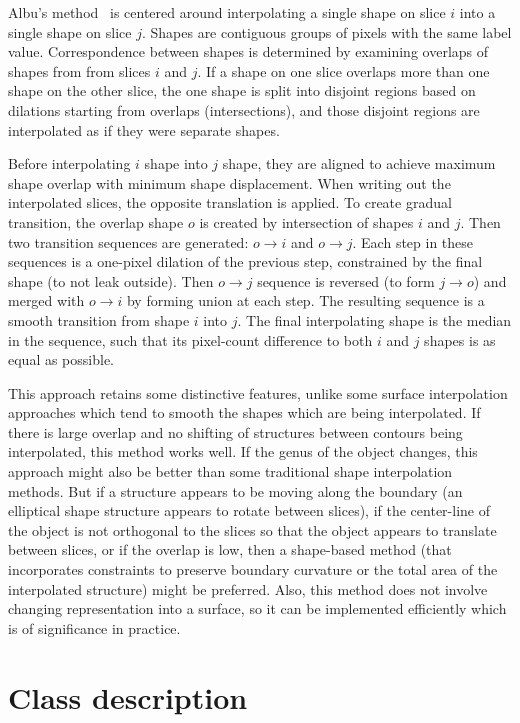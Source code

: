 \documentclass{InsightArticle}
\begin{document}
Albu's method~\cite{Albu2008} is centered around interpolating a single shape on
slice $i$ into a single shape on slice $j$.
Shapes are contiguous groups of pixels with the same label value.
Correspondence between shapes is determined by examining overlaps
of shapes from from slices $i$ and $j$.
If a shape on one slice overlaps more than one shape on the other slice,
the one shape is split into disjoint regions based on dilations
starting from overlaps (intersections),
and those disjoint regions are interpolated as if they were separate shapes.

Before interpolating $i$ shape into $j$ shape, they are aligned
to achieve maximum shape overlap with minimum shape displacement.
When writing out the interpolated slices, the opposite translation is applied.
To create gradual transition, the overlap shape $o$ is created
by intersection of shapes $i$ and $j$.
Then two transition sequences are generated: $o\rightarrow i$ and $o\rightarrow j$.
Each step in these sequences is a one-pixel dilation of the previous step,
constrained by the final shape (to not leak outside).
Then $o\rightarrow j$ sequence is reversed (to form $j\rightarrow o$) and
merged with $o\rightarrow i$ by forming union at each step.
The resulting sequence is a smooth transition from shape $i$ into $j$.
The final interpolating shape is the median in the sequence, such that its
pixel-count difference to both $i$ and $j$ shapes is as equal as possible.

This approach retains some distinctive features, unlike some surface interpolation
approaches which tend to smooth the shapes which are being interpolated.
If there is large overlap and no shifting of structures
between contours being interpolated, this method works well.
If the genus of the object changes, this approach might also be better
than some traditional shape interpolation methods.
But if a structure appears to be moving along the boundary
(an elliptical shape structure appears to rotate between slices),
if the center-line of the object is not orthogonal to the slices
so that the object appears to translate between slices, or if the overlap is low,
then a shape-based method (that incorporates constraints to preserve
boundary curvature or the total area of the interpolated structure) might be preferred.
Also, this method does not involve changing representation into a surface,
so it can be implemented efficiently which is of significance in practice.

\section{Class description}
\end{document}
